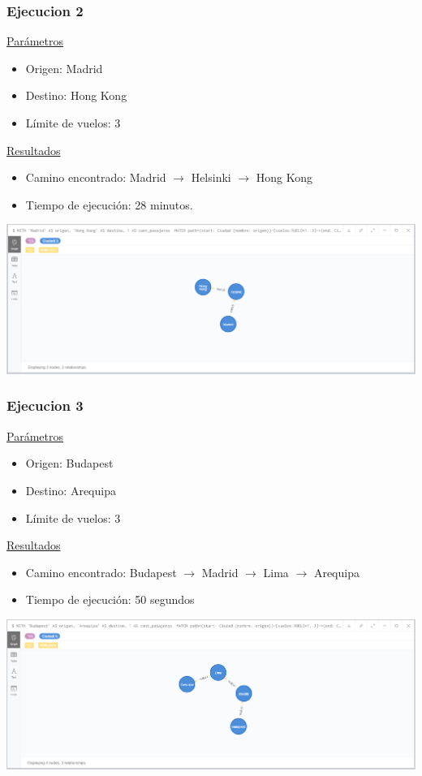 \documentclass[a4paper,11pt]{article}
\begin{document}
\subsubsection*{Ejecucion 2}
\noindent
\underline{Parámetros}
\begin{itemize}
\item Origen: Madrid
\item Destino: Hong Kong
\item Límite de vuelos: 3
\end{itemize}
\underline{Resultados}
\begin{itemize}
\item Camino encontrado: Madrid $\rightarrow$ Helsinki $\rightarrow$ Hong Kong
\item Tiempo de ejecución: 28 minutos.
\end{itemize}
\begin{center}
\includegraphics[scale=0.40]{./imagenes/consultaA-ejec2.png}
\end{center}

\subsubsection*{Ejecucion 3}
\noindent
\underline{Parámetros}
\begin{itemize}
\item Origen: Budapest
\item Destino: Arequipa
\item Límite de vuelos: 3
\end{itemize}
\underline{Resultados}
\begin{itemize}
\item Camino encontrado: Budapest $\rightarrow$ Madrid $\rightarrow$ Lima $\rightarrow$ Arequipa
\item Tiempo de ejecución: 50 segundos
\end{itemize}
\begin{center}
\includegraphics[scale=0.40]{./imagenes/consultaA-ejec3.png}
\end{center}
\end{document}
